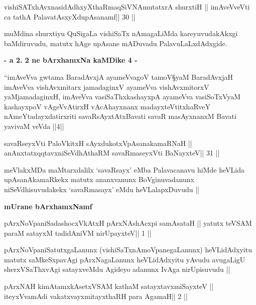 \begin{shl}
vishiSATxhAvxnasidAdhxyXthaRmaqSiVNAmutatxrA shurxtiH ||
imAveVveVti ca tathA PalavatAsxyXdupAsanamf\hfill || 30 ||
\end{shl}

\begin{artha}
muMdina shurxtiyu QuSigaLa vishiSaTx nAmagaLiMda kareyuvudakAkxgi
baMdiruvudu, matutx hAge upAsane mADuvadu PalavuLaLxdAdxgide.
\end{artha}

\medskip
{\centerline{\textbf{- a 2. 2 ne bArxhamxNa kaMDike 4 -}}}

\begin{artha}
``imAveVva gwtama BaradAvxjA ayameVvagoV tamoV\S yaM BaradAvxjaH
  imAveVva vishAvxmitarx jamadaginxV ayameVva vishAvxmitorxV\s
  yaMjamadaginxH, imAveVva vasiSaThxkashayxpA ayameVva vasiSoTxV\s yaM
  kashayxpoV vAgeVvAtirxH vAcAhayxnanx madayxteV\s titxhaRveY
  nAmeYtadayxdatirxriti savaRsAyxtAtxBavati savaR masAyxnanxM Bavati
  yavivaM veVda ||4||
\end{artha}

\begin{shl}
savaRseyxVti PaloVkitxH sAyxdukotxVpAsanakamaRNaH ||
anAnxtatxqqtavxniSeVdhAthaRM savaRmaseyxVti BaNayxteV\hfill || 31 ||
\end{shl}

\begin{artha}
meVlakxMDa maMtarxdalilx `savaRsayx' eMba Palavacanavu hiMde heVLida
upAsanAkamaRkekx matutx ananxvanunx BoVginuvadanunx niSeVdhisuvudakekx
`savaRmasayx' eMdu heVLalapxDuvudu || 
\end{artha}

{\centerline{\textbf{mUrane bArxhamxNamf}}}

\begin{shl}
pArxNoVpaniSadashocxVkAtxH pArxNAshAcxpi samAsataH ||
yatutx teVSAM paraM satayxM tadidAniVM nirUpayxteV\hfill || 1 ||
\end{shl}

\begin{artha}
pArxNoVpaniSatutxgaLanunx (vishiSaTxnAmoVpanegaLanunx) heVLidAdxyitu
matutx saMkeSxpavAgi pArxNagaLanunx heVLidAdxyitu yAvudu avugaLigU
sherxVSaThxvAgi satayxveMdu Agideyo adanunx IvAga nirUpisuvudu ||
\end{artha}

\begin{shl}
pArxNAH kimAtamxkAsetxVSAM kathaM satayxtavxmiSayxteV ||
iteyxVvamAdi vakatxvayxmitayxthaRH para AgamaH\hfill || 2 ||
\end{shl}

